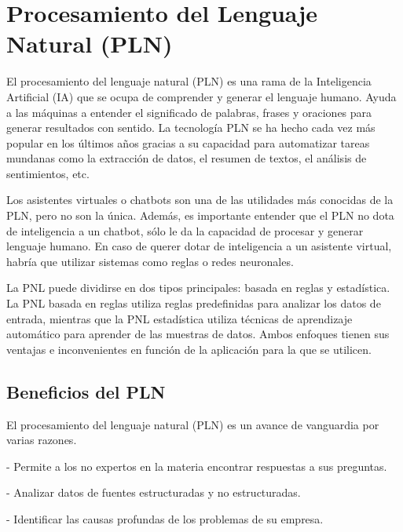 {{{{{\section{Procesamiento del Lenguaje Natural (PLN)}

El procesamiento del lenguaje natural (PLN) es una rama de la Inteligencia Artificial (IA) que se ocupa de comprender y generar el lenguaje humano. Ayuda a las máquinas a entender el significado de palabras, frases y oraciones para generar resultados con sentido. La tecnología PLN se ha hecho cada vez más popular en los últimos años gracias a su capacidad para automatizar tareas mundanas como la extracción de datos, el resumen de textos, el análisis de sentimientos, etc.{\vspace{0.3cm}


Los asistentes virtuales o chatbots son una de las utilidades más conocidas de la PLN, pero no son la única. Además, es importante entender que el PLN no dota de inteligencia a un chatbot, sólo le da la capacidad de procesar y generar lenguaje humano. En caso de querer dotar de inteligencia a un asistente virtual, habría que utilizar sistemas como reglas o redes neuronales.{\vspace{0.3cm}


La PNL puede dividirse en dos tipos principales: basada en reglas y estadística. La PNL basada en reglas utiliza reglas predefinidas para analizar los datos de entrada, mientras que la PNL estadística utiliza técnicas de aprendizaje automático para aprender de las muestras de datos. Ambos enfoques tienen sus ventajas e inconvenientes en función de la aplicación para la que se utilicen.\vspace{1cm}


\subsection{Beneficios del PLN}

El procesamiento del lenguaje natural (PLN) es un avance de vanguardia por varias razones.{\vspace{0.3cm}

- Permite a los no expertos en la materia encontrar respuestas a sus preguntas.{\vspace{0.1cm}

- Analizar datos de fuentes estructuradas y no estructuradas.{\vspace{0.1cm}

- Identificar las causas profundas de los problemas de su empresa.{\vspace{0.1cm}

}}}}}}}}}}}
